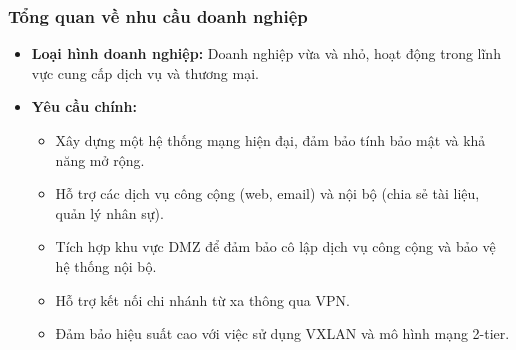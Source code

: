 \documentclass[13pt]{article}
\begin{document}
\subsubsection{Tổng quan về nhu cầu doanh nghiệp}
\begin{itemize}
    \item \textbf{Loại hình doanh nghiệp: }Doanh nghiệp vừa và nhỏ, hoạt động trong lĩnh vực cung cấp dịch vụ và thương mại.
    \item \textbf{Yêu cầu chính:}
    \begin{itemize}
        \item Xây dựng một hệ thống mạng hiện đại, đảm bảo tính bảo mật và khả năng mở rộng.
        \item Hỗ trợ các dịch vụ công cộng (web, email) và nội bộ (chia sẻ tài liệu, quản lý nhân sự).
        \item Tích hợp khu vực DMZ để đảm bảo cô lập dịch vụ công cộng và bảo vệ hệ thống nội bộ.
        \item Hỗ trợ kết nối chi nhánh từ xa thông qua VPN.
        \item Đảm bảo hiệu suất cao với việc sử dụng VXLAN và mô hình mạng 2-tier.
    \end{itemize}
\end{itemize}
\end{document}
